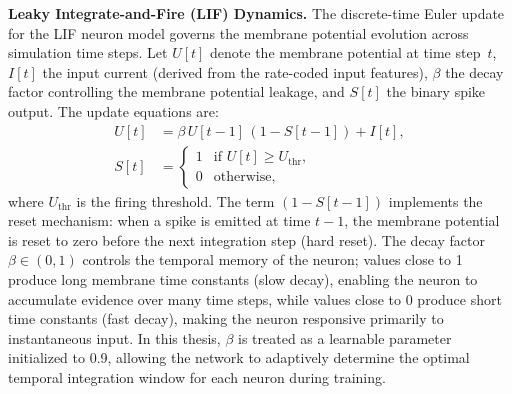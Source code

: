 \textbf{Leaky Integrate-and-Fire (LIF) Dynamics.} The discrete-time Euler update for the LIF neuron model governs the membrane potential evolution across simulation time steps. Let $U[t]$ denote the membrane potential at time step~$t$, $I[t]$ the input current (derived from the rate-coded input features), $\beta$ the decay factor controlling the membrane potential leakage, and $S[t]$ the binary spike output. The update equations are:
\begin{align}
U[t] &= \beta \, U[t-1] \, (1 - S[t-1]) + I[t], \label{eq:lif-update} \\
S[t] &= \begin{cases} 1 & \text{if } U[t] \geq U_{\text{thr}}, \\ 0 & \text{otherwise,} \end{cases} \label{eq:lif-spike}
\end{align}
where $U_{\text{thr}}$ is the firing threshold. The term $(1 - S[t-1])$ implements the reset mechanism: when a spike is emitted at time $t-1$, the membrane potential is reset to zero before the next integration step (hard reset). The decay factor $\beta \in (0, 1)$ controls the temporal memory of the neuron; values close to 1 produce long membrane time constants (slow decay), enabling the neuron to accumulate evidence over many time steps, while values close to 0 produce short time constants (fast decay), making the neuron responsive primarily to instantaneous input. In this thesis, $\beta$ is treated as a learnable parameter initialized to 0.9, allowing the network to adaptively determine the optimal temporal integration window for each neuron during training.

